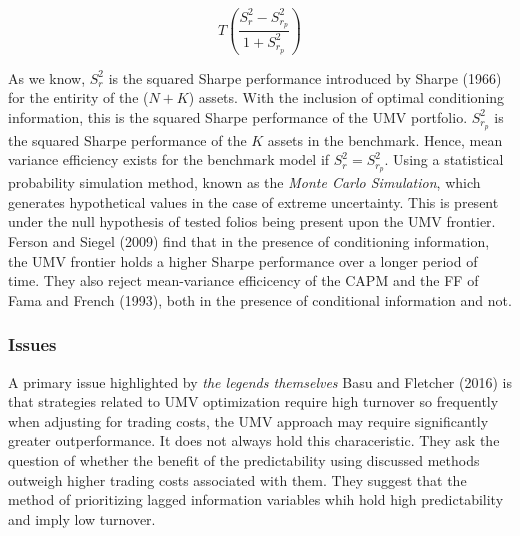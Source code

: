 \documentclass[11pt, english]{article}
\begin{document}
	$$T\left(\frac{S_r^2-S_{r_p}^2}{1+S_{r_p}^2}\right)$$

	As we know, $S_r^2$ is the squared Sharpe performance introduced by Sharpe (1966) for the entirity of the ($N+K$) assets. With the inclusion of optimal conditioning information, this is the squared Sharpe performance of the UMV portfolio. $S_{r_p}^2$ is the squared Sharpe performance of the $K$ assets in the benchmark. Hence, mean variance efficiency exists for the benchmark model if $S_r^2=S_{r_p}^2$. Using a statistical probability simulation method, known as the \textit{Monte Carlo Simulation}, which generates hypothetical values in the case of extreme uncertainty. This is present under the null hypothesis of tested folios being present upon the UMV frontier. Ferson and Siegel (2009) find that in the presence of conditioning information, the UMV frontier holds a higher Sharpe performance over a longer period of time. They also reject mean-variance efficicency of the CAPM and the FF of Fama and French (1993), both in the presence of conditional information and not.
		
		\subsubsection*{Issues}
	
	A primary issue highlighted by \textit{the legends themselves} Basu and Fletcher (2016) is that strategies related to UMV optimization require high turnover so frequently when adjusting for trading costs, the UMV approach may require significantly greater outperformance. It does not always hold this characeristic. They ask the question of whether the benefit of the predictability using discussed methods outweigh higher trading costs associated with them. They suggest that the method of prioritizing lagged information variables whih hold high predictability and imply low turnover.
\end{document}
